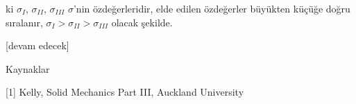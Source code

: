 \documentclass[12pt,fleqn]{article}\usepackage{../../common}
\begin{document}
ki $\sigma_I$, $\sigma_{II}$, $\sigma_{III}$ $\sigma$'nin özdeğerleridir, elde
edilen özdeğerler büyükten küçüğe doğru sıralanır, $\sigma_I > \sigma_{II} > \sigma_{III}$
olacak şekilde.

















[devam edecek]

Kaynaklar

[1] Kelly, Solid Mechanics Part III, Auckland University
\end{document}
